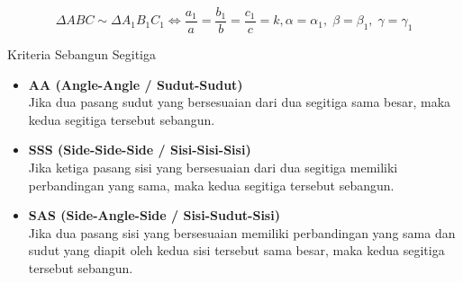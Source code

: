 ﻿\documentclass[aspectratio=169]{beamer}
\theoremstyle{definition}
\begin{document}
\begin{frame}{\insertsection}{\insertsubsection}
\begin{center}
  \end{center}
  \vspace*{-0.3cm}
  \[
    \boxed{\Delta ABC \sim \Delta A_1B_1C_1\iff\frac{a_1}{a}=\frac{b_1}{b}=\frac{c_1}{c}=k,\alpha = \alpha_1,\;\beta = \beta_1,\;\gamma = \gamma_1}
  \]
\end{frame}

\begin{frame}{\insertsection}{\insertsubsection}
  \begin{block}{Kriteria Sebangun Segitiga}
    \begin{itemize}
      \item \textbf{AA (Angle-Angle / Sudut-Sudut)} \\
            Jika dua pasang sudut yang bersesuaian dari dua segitiga sama besar, maka kedua segitiga tersebut sebangun.

      \item \textbf{SSS (Side-Side-Side / Sisi-Sisi-Sisi)} \\
            Jika ketiga pasang sisi yang bersesuaian dari dua segitiga memiliki perbandingan yang sama, maka kedua segitiga tersebut sebangun.

      \item \textbf{SAS (Side-Angle-Side / Sisi-Sudut-Sisi)} \\
            Jika dua pasang sisi yang bersesuaian memiliki perbandingan yang sama dan sudut yang diapit oleh kedua sisi tersebut sama besar, maka kedua segitiga tersebut sebangun.
    \end{itemize}
  \end{block}
\end{frame}
\end{document}
